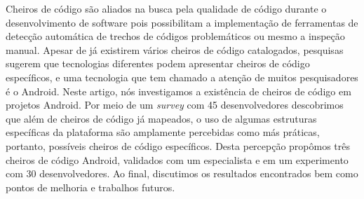 Cheiros de c\'odigo s\~ao aliados na busca pela qualidade de c\'odigo durante o desenvolvimento de software pois possibilitam a implementa\c{c}\~ao de ferramentas de detec\c{c}\~ao autom\'atica de trechos de c\'odigos problem\'aticos ou mesmo a inspe\c{c}\~ao manual. Apesar de j\'a existirem v\'arios cheiros de c\'odigo catalogados, pesquisas sugerem que tecnologias diferentes podem apresentar cheiros de c\'odigo espec\'ificos, e uma tecnologia que tem chamado a aten\c{c}\~ao de muitos pesquisadores \'e o Android. Neste artigo, n\'os investigamos a exist\^encia de cheiros de c\'odigo em projetos Android. Por meio de um \textit{survey} com 45 desenvolvedores descobrimos que al\'em de cheiros de c\'odigo j\'a mapeados, o uso de algumas estruturas espec\'ificas da plataforma s\~ao amplamente percebidas como m\'as pr\'aticas, portanto, poss\'iveis cheiros de c\'odigo espec\'ificos. Desta percep\c{c}\~ao prop\^omos tr\^es cheiros de c\'odigo Android, validados com um especialista e em um experimento com 30 desenvolvedores. Ao final, discutimos os resultados encontrados bem como pontos de melhoria e trabalhos futuros.